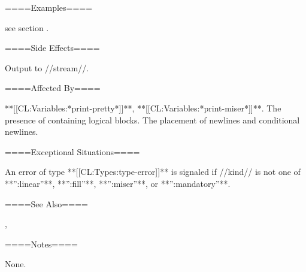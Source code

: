 ====Examples====

see section {\secref\PrettyPrinterExamples}.

====Side Effects====

Output to //stream//.

====Affected By====

**[[CL:Variables:*print-pretty*]]**, **[[CL:Variables:*print-miser*]]**. The presence of containing logical blocks. The placement of newlines and conditional newlines.

====Exceptional Situations====

An error of type **[[CL:Types:type-error]]** is signaled if //kind// is not one of **'':linear''**, **'':fill''**, **'':miser''**, or **'':mandatory''**.

====See Also====

{\secref\TildeUnderscore}, {\secref\PrettyPrinterExamples}

====Notes====

None.

 
